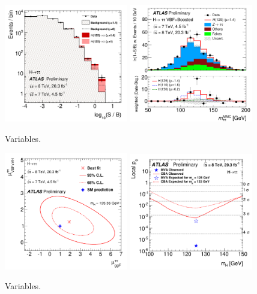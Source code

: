 \begin{figure}[tp]
  \centering
  \includegraphics[width=0.48\textwidth]{figures/ATLAS-CONF-2014-061/fig_10}
  \includegraphics[width=0.48\textwidth]{figures/ATLAS-CONF-2014-061/fig_11b}
  \caption{Variables.}
  \label{fig:results-money-plots}
\end{figure}

\begin{figure}[tp]
  \centering
  \includegraphics[width=0.48\textwidth]{figures/ATLAS-CONF-2014-061/fig_12}
  \includegraphics[width=0.48\textwidth]{figures/ATLAS-CONF-2014-061/fig_14}
  \caption{Variables.}
  \label{fig:results-mup0}
\end{figure}

